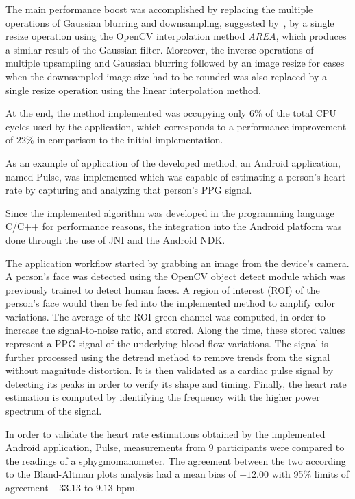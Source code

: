 The main performance boost was accomplished by replacing the multiple
operations of Gaussian blurring and downsampling, suggested
by~\cite{Wu2012Eulerian}, by a single resize operation using the OpenCV
interpolation method \emph{AREA}, which produces a similar result of the
Gaussian filter. Moreover, the inverse operations of multiple
upsampling and Gaussian blurring followed by an image resize
for cases when the downsampled image size had to be rounded was also
replaced by a single resize operation using the linear interpolation method.

At the end, the \evm{} method implemented was occupying only 6\% of the total
CPU cycles used by the application, which corresponds to a performance
improvement of 22\% in comparison to the initial implementation.

As an example of application of the developed \evm{} method, an Android
application, named Pulse, was implemented which was capable of estimating a
person's heart rate by capturing and analyzing that person's PPG signal.

Since the implemented algorithm was developed in the programming language
C/C++ for performance reasons, the integration into the Android platform
was done through the use of JNI and the Android NDK.

The application workflow started by grabbing an image from the device's
camera. A person's face was detected using the OpenCV object detect module
which was previously trained to detect human faces. A region of interest (ROI)
of the person's face would then be fed into the implemented \evm{} method to
amplify color variations. The average of the ROI green channel was computed,
in order to increase the signal-to-noise ratio, and stored. Along the time,
these stored values represent a PPG signal of the underlying blood flow
variations. The signal is further processed using the detrend method
to remove trends from the signal without magnitude distortion. It is then
validated as a cardiac pulse signal by detecting its peaks in order to
verify its shape and timing. Finally, the heart rate estimation is
computed by identifying the frequency with the higher power spectrum of
the signal.

In order to validate the heart rate estimations obtained by the implemented
Android application, Pulse, measurements from 9 participants were compared
to the readings of a sphygmomanometer. The agreement between the two
according to the Bland-Altman plots analysis had a mean bias of $-12.00$ with
95\% limits of agreement $-33.13$ to $9.13$ bpm.

